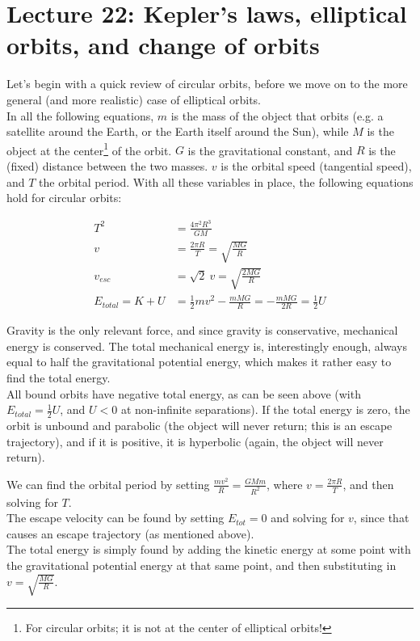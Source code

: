 
\section{Lecture 22: Kepler's laws, elliptical orbits, and change of orbits}

Let's begin with a quick review of circular orbits, before we move on to the more general (and more realistic) case of elliptical orbits.\\
In all the following equations, $m$ is the mass of the object that orbits (e.g. a satellite around the Earth, or the Earth itself around the Sun), while $M$ is the object at the center\footnote{For circular orbits; it is not at the center of elliptical orbits!} of the orbit. $G$ is the gravitational constant, and $R$ is the (fixed) distance between the two masses. $v$ is the orbital speed (tangential speed), and $T$ the orbital period. With all these variables in place, the following equations hold for circular orbits:

\begin{align}
T^2 &= \frac{4 \pi^2 R^3}{G M}\\
v &= \frac{2 \pi R}{T} = \sqrt{\frac{M G}{R}}\\
v_{esc} &= \sqrt{2}\ v = \sqrt{\frac{2 M G}{R}}\\
E_{total} = K + U &= \frac{1}{2} m v^2 - \frac{m M G}{R} = - \frac{m M G}{2R} = \frac{1}{2} U
\end{align}

Gravity is the only relevant force, and since gravity is conservative, mechanical energy is conserved. The total mechanical energy is, interestingly enough, always equal to half the gravitational potential energy, which makes it rather easy to find the total energy.\\
All bound orbits have negative total energy, as can be seen above (with $E_{total} = \frac{1}{2} U$, and $U < 0$ at non-infinite separations). If the total energy is zero, the orbit is unbound and parabolic (the object will never return; this is an escape trajectory), and if it is positive, it is hyperbolic (again, the object will never return).

We can find the orbital period by setting $\displaystyle \frac{m v^2}{R} = \frac{G M m}{R^2}$, where $\displaystyle v = \frac{2 \pi R}{T}$, and then solving for $T$.\\
The escape velocity can be found by setting $E_{tot} = 0$ and solving for $v$, since that causes an escape trajectory (as mentioned above).\\
The total energy is simply found by adding the kinetic energy at some point with the gravitational potential energy at that same point, and then substituting in $\displaystyle v = \sqrt{\frac{M G}{R}}$.

